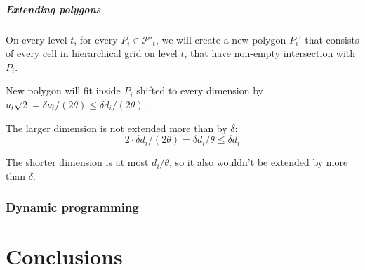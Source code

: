 \documentclass[en]{pracamgr}
\begin{document}
\paragraph{Extending polygons}
On every level $t$, for every $P_i \in \mathcal{P'}_t$,
we will create a new polygon $P_i'$ that
consists of every cell in hierarchical grid on level $t$,
that have non-empty intersection with $P_i$.

New polygon will fit inside $P_i$ shifted to every dimension by
$u_t\sqrt{2} = \delta \nu_t/(2\theta) \le \delta d_i/(2\theta)$.

The larger dimension is not extended more than by $\delta$:
$$2 \cdot \delta d_i/(2\theta) = \delta d_i/\theta \le \delta d_i$$

The shorter dimension is at most $d_i/\theta$,
so it also wouldn't be extended by more than $\delta$.



\subsection{Dynamic programming}






\chapter{Conclusions}
\end{document}
